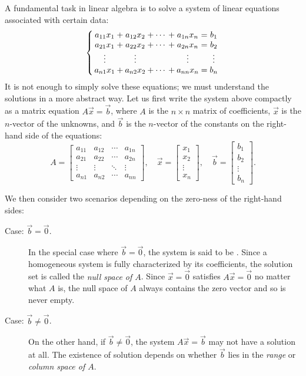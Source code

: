 \documentclass{ximera}
\begin{document}
A fundamental task in linear algebra is to solve a system of linear
equations associated with certain data:
\begin{equation*}
  \left\{ \,
    \begin{array}{*{9}{@{}c@{}}}
      a_{11} x_1 & {}+{} & a_{12} x_2 & {}+{} & \cdots & {}+{} & a_{1n} x_n & {}\mathrel{=}{} & b_1 \\
      a_{21} x_1 & {}+{} & a_{22} x_2 & {}+{} & \cdots & {}+{} & a_{2n} x_n & {}\mathrel{=}{} & b_2 \\
      \vdots         &       & \vdots         &      &   &       & \vdots         &                 & \vdots \\
      a_{n1} x_1 & {}+{} & a_{n2} x_2 & {}+{} & \cdots & {}+{} & a_{nn} x_n & {}\mathrel{=}{} & b_n
    \end{array}
    \, \right.
\end{equation*}
It is not enough to simply solve these equations; we must understand
the solutions in a more abstract way. Let us first write the system
above compactly as a matrix equation $A \vec{x} = \vec{b}$, where $A$
is the $n \times n$ matrix of coefficients, $\vec{x}$ is the
$n$-vector of the unknowns, and $\vec{b}$ is the $n$-vector of the constants on the 
right-hand side of the equations:
\[
  A =
  \begin{bmatrix}
    a_{11} & a_{12} & \cdots & a_{1n} \\
    a_{21} & a_{22} & \cdots & a_{2n} \\
    \vdots & \vdots & \ddots & \vdots \\
    a_{n1} & a_{n2} & \cdots & a_{nn}
  \end{bmatrix}, \quad
  \vec{x} =
  \begin{bmatrix}
    x_1 \\ x_2 \\ \vdots \\ x_n
  \end{bmatrix}, \quad
  \vec{b} =
  \begin{bmatrix}
    b_1 \\ b_2 \\ \vdots \\ b_n
  \end{bmatrix}.
\]

We then consider two scenarios depending on the zero-ness of the right-hand
sides:
\begin{description}
\item[Case: $\vec{b} = \vec{0}$.] In the special case where $\vec{b} = \vec{0}$,
  the system is said to be . Since a homogeneous system is
  fully characterized by its coefficients, the solution set is called the
  \textit{null space of $A$}. Since $\vec{x} = \vec{0}$ satisfies $A\vec{x} =
  \vec{0}$ no matter what $A$ is, the null space of $A$ always contains the zero
  vector and so is never empty.
\item[Case: $\vec{b} \neq \vec{0}$.] On the other hand, if $\vec{b} \neq
  \vec{0}$, the system $A\vec{x} = \vec{b}$ may not have a solution at all. The
  existence of solution depends on whether $\vec{b}$ lies in the \textit{range}
  or \textit{column space of $A$}.
\end{description}
\end{document}
